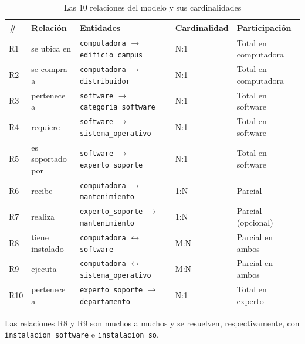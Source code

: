\documentclass[10pt,a4paper]{article}
\begin{document}
\begin{table}[H]
	\centering
	\footnotesize
	\begin{tabular}{p{0.6cm} | p{3cm} | p{4.3cm} | p{2.3cm} | p{3.5cm}}\hline \hline
		\textbf{\#} & \textbf{Relación} & \textbf{Entidades} & \textbf{Cardinalidad} & \textbf{Participación} \\ \hline \hline
		R1 & se ubica en & \texttt{computadora} $\rightarrow$ \texttt{edificio\_campus} & N:1 & Total en computadora \\ \hline
		R2 & se compra a & \texttt{computadora} $\rightarrow$ \texttt{distribuidor} & N:1 & Total en computadora \\ \hline
		R3 & pertenece a & \texttt{software} $\rightarrow$ \texttt{categoria\_software} & N:1 & Total en software \\ \hline
		R4 & requiere & \texttt{software} $\rightarrow$ \texttt{sistema\_operativo} & N:1 & Total en software \\ \hline
		R5 & es soportado por & \texttt{software} $\rightarrow$ \texttt{experto\_soporte} & N:1 & Total en software \\ \hline
		R6 & recibe & \texttt{computadora} $\rightarrow$ \texttt{mantenimiento} & 1:N & Parcial \\ \hline
		R7 & realiza & \texttt{experto\_soporte} $\rightarrow$ \texttt{mantenimiento} & 1:N & Parcial (opcional) \\ \hline
		R8 & tiene instalado & \texttt{computadora} $\leftrightarrow$ \texttt{software} & M:N & Parcial en ambos \\ \hline
		R9 & ejecuta & \texttt{computadora} $\leftrightarrow$ \texttt{sistema\_operativo} & M:N & Parcial en ambos \\ \hline
		R10 & pertenece a & \texttt{experto\_soporte} $\rightarrow$ \texttt{departamento} & N:1 & Total en experto \\ \hline \hline
	\end{tabular}
	\caption{Las 10 relaciones del modelo y sus cardinalidades}
	\label{tabla:relaciones}
\end{table}

Las relaciones R8 y R9 son muchos a muchos y se resuelven, respectivamente, con \texttt{instalacion\_software} e \texttt{instalacion\_so}.

\subsection{ \color{colorESCOM}{Modelo Entidad-Relación}}
\end{document}
